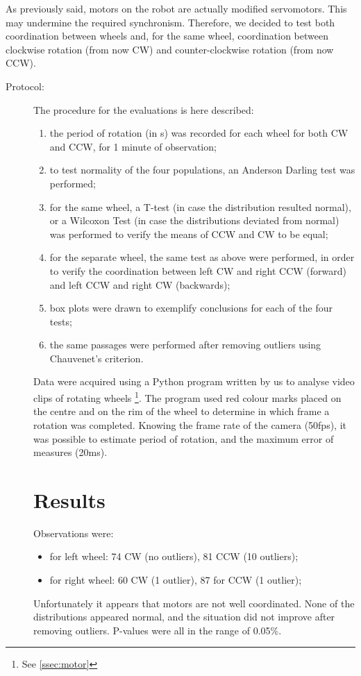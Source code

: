 \documentclass[a4paper,twoside]{book}
\begin{document}
As previously said, motors on the robot are actually modified servomotors. This may undermine the required synchronism. Therefore, we decided to test both coordination between wheels and, for the same wheel, coordination between clockwise rotation (from now CW) and counter-clockwise rotation (from now CCW). 

\begin{description}
\item[Protocol:]
  The procedure for the evaluations is here described:
  \begin{enumerate}
    \item the period of rotation (in s) was recorded for each wheel for both CW and CCW, for 1 minute of observation;
    \item to test normality of the four populations, an Anderson Darling test was performed;
    \item for the same wheel, a T-test (in case the distribution resulted normal), or a Wilcoxon Test (in case the distributions deviated from normal) was performed to verify the means of CCW and CW to be equal;
    \item for the separate wheel, the same test as above were performed, in order to verify the coordination between left CW and right CCW (forward) and left CCW and right CW (backwards);
    \item box plots were drawn to exemplify conclusions for each of the four tests;
    \item the same passages were performed after removing outliers using Chauvenet's criterion.
  \end{enumerate}
  Data were acquired using a Python program written by us to analyse video clips of rotating wheels%
  \footnote{See \autoref{ssec:motor}}.
  The program used red colour marks placed on the centre and on the rim of the wheel to determine in which frame a rotation was completed. Knowing the frame rate of the camera (50fps), it was possible to estimate period of rotation, and the maximum error of measures (20ms).

\chapter{Results}
  Observations were:
  \begin{itemize}
    \item for left wheel: 74 CW (no outliers), 81 CCW (10 outliers);
    \item for right wheel: 60 CW (1 outlier), 87 for CCW (1 outlier);
  \end{itemize}
  Unfortunately it appears that motors are not well coordinated. None of the distributions appeared normal, and the situation did not improve after removing outliers. P-values were all in the range of 0.05\%.


\end{description}
\end{document}

